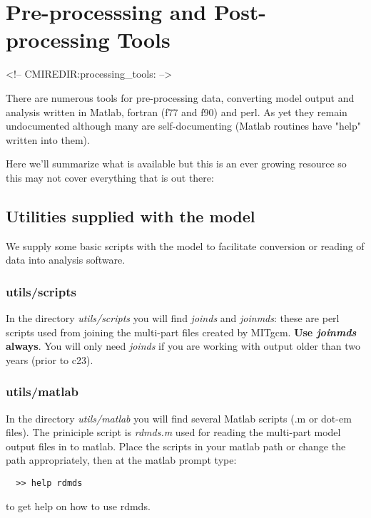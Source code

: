 
\chapter{Pre-processsing and Post-processing Tools}
\begin{rawhtml}
<!-- CMIREDIR:processing_tools: -->
\end{rawhtml}

There are numerous tools for pre-processing data, converting model
output and analysis written in Matlab, fortran (f77 and f90) and perl.
As yet they remain undocumented although many are self-documenting
(Matlab routines have "help" written into them).

Here we'll summarize what is available but this is an ever growing resource
so this may not cover everything that is out there:

\section{Utilities supplied with the model}

We supply some basic scripts with the model to facilitate conversion or reading
of data into analysis software.

\subsection{utils/scripts}

In the directory {\em utils/scripts} you will find {\em joinds} and {\em joinmds}:
these are perl scripts used from joining the multi-part files created by
MITgcm. {\bf Use {\em joinmds} always}. You will only need {\em joinds} if you
are working with output older than two years (prior to c23).

\subsection{utils/matlab}

In the directory {\em utils/matlab} you will find several Matlab scripts
(.m or dot-em files). The priniciple script is {\em rdmds.m} used for reading
the multi-part model output files in to matlab. Place the scripts in your
matlab path or change the path appropriately, then at the matlab prompt type:
\begin{verbatim}
  >> help rdmds
\end{verbatim}
to get help on how to use rdmds.


